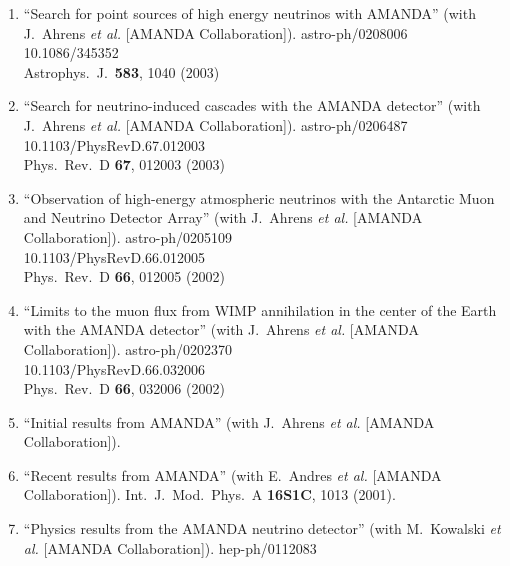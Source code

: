 \begin{enumerate}
\item ``Search for point sources of high energy neutrinos with AMANDA'' (with J.~Ahrens {\it et al.}  [AMANDA Collaboration]). astro-ph/0208006
    \\{}10.1086/345352
\\{}Astrophys.\ J.\  {\bf 583}, 1040 (2003) %


\item ``Search for neutrino-induced cascades with the AMANDA detector'' (with J.~Ahrens {\it et al.}  [AMANDA Collaboration]). astro-ph/0206487
    \\{}10.1103/PhysRevD.67.012003
\\{}Phys.\ Rev.\ D {\bf 67}, 012003 (2003) %


\item ``Observation of high-energy atmospheric neutrinos with the Antarctic Muon and Neutrino Detector Array'' (with J.~Ahrens {\it et al.}  [AMANDA Collaboration]). astro-ph/0205109
    \\{}10.1103/PhysRevD.66.012005
\\{}Phys.\ Rev.\ D {\bf 66}, 012005 (2002) %



\item ``Limits to the muon flux from WIMP annihilation in the center of the Earth with the AMANDA detector'' (with J.~Ahrens {\it et al.}  [AMANDA Collaboration]). astro-ph/0202370
    \\{}10.1103/PhysRevD.66.032006
\\{}Phys.\ Rev.\ D {\bf 66}, 032006 (2002) %


\item ``Initial results from AMANDA'' (with J.~Ahrens {\it et al.}  [AMANDA Collaboration]).
  


\item ``Recent results from AMANDA'' (with E.~Andres {\it et al.}  [AMANDA Collaboration]). Int.\ J.\ Mod.\ Phys.\ A {\bf 16S1C}, 1013 (2001). %


\item ``Physics results from the AMANDA neutrino detector'' (with M.~Kowalski {\it et al.}  [AMANDA Collaboration]). hep-ph/0112083
  

\end{enumerate}

